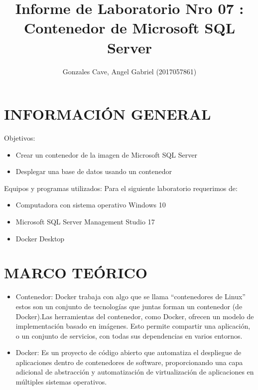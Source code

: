\documentclass[preprint,12pt]{elsarticle}
\begin{document}
	\begin{frontmatter}
		\title{\huge Informe de Laboratorio Nro 07 : Contenedor de Microsoft SQL Server}
		\address{Universidad Privada de Tacna}
		\address{Escuela Profesional de Ingeniería de Sistemas}
		\address{Curso : Base de Datos II}		
		\author{Gonzales Cave, Angel Gabriel              	(2017057861)}		
		\address{Tacna, Perú}
	\end{frontmatter}

\section{INFORMACIÓN GENERAL}
Objetivos:
\begin{itemize}
\item Crear un contenedor de la imagen de Microsoft SQL Server 
\item Desplegar una base de datos usando un contenedor
\end{itemize}
Equipos y programas utilizados:
Para el siguiente laboratorio requerimos de:
\begin{itemize}
\item Computadora con sistema operativo Windows 10
\item Microsoft SQL Server Management Studio 17
\item Docker Desktop
\end{itemize}

\section{MARCO TEÓRICO}
\begin{itemize}
\item Contenedor: Docker trabaja con algo que se llama “contenedores de Linux” estos son un conjunto de tecnologías que juntas forman un contenedor (de Docker).Las herramientas del contenedor, como Docker, ofrecen un modelo de implementación basado en imágenes. Esto permite compartir una aplicación, o un conjunto de servicios, con todas sus dependencias en varios entornos.
\item Docker: Es un proyecto de código abierto que automatiza el despliegue de aplicaciones dentro de contenedores de software, proporcionando una capa adicional de abstracción y automatización de virtualización de aplicaciones en múltiples sistemas operativos.
\end{itemize}
\end{document}
